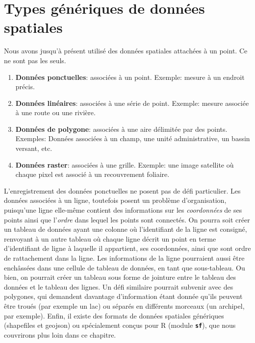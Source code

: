 \documentclass[]{book}
\providecommand{\tightlist}{%
  \setlength{\itemsep}{0pt}\setlength{\parskip}{0pt}}
\begin{document}
\hypertarget{types-guxe9nuxe9riques-de-donnuxe9es-spatiales}{%
\section{Types génériques de données
spatiales}\label{types-guxe9nuxe9riques-de-donnuxe9es-spatiales}}

Nous avons jusqu'à présent utilisé des données spatiales attachées à un
point. Ce ne sont pas les seuls.

\begin{enumerate}
\def\labelenumi{\arabic{enumi}.}
\tightlist
\item
  \textbf{Données ponctuelles}: associées à un point. Exemple: mesure à
  un endroit précis.
\item
  \textbf{Données linéaires}: associées à une série de point. Exemple:
  mesure associée à une route ou une rivière.
\item
  \textbf{Données de polygone}: associées à une aire délimitée par des
  points. Exemples: Données associées à un champ, une unité
  administrative, un bassin versant, etc.
\item
  \textbf{Données raster}: associées à une grille. Exemple: une image
  satellite où chaque pixel est associé à un recouvrement foliaire.
\end{enumerate}

L'enregistrement des données ponctuelles ne posent pas de défi
particulier. Les données associées à un ligne, toutefois posent un
problème d'organisation, puisqu'une ligne elle-même contient des
informations sur les \emph{coordonnées} de ses points ainsi que
l'\emph{ordre} dans lequel les points sont connectés. On pourra soit
créer un tableau de données ayant une colonne où l'identifiant de la
ligne est consigné, renvoyant à un autre tableau où chaque ligne décrit
un point en terme d'identifiant de ligne à laquelle il appartient, ses
coordonnées, ainsi que sont ordre de rattachement dans la ligne. Les
informations de la ligne pourraient aussi être enchâssées dans une
cellule de tableau de données, en tant que sous-tableau. Ou bien, on
pourrait créer un tableau sous forme de jointure entre le tableau des
données et le tableau des lignes. Un défi similaire pourrait subvenir
avec des polygones, qui demandent davantage d'information étant donnée
qu'ils peuvent être troués (par exemple un lac) ou séparés en différents
morceaux (un archipel, par exemple). Enfin, il existe des formats de
données spatiales génériques (shapefiles et geojson) ou spécialement
conçus pour R (module \textbf{\texttt{sf}}), que nous couvrirons plus
loin dans ce chapitre.
\end{document}

